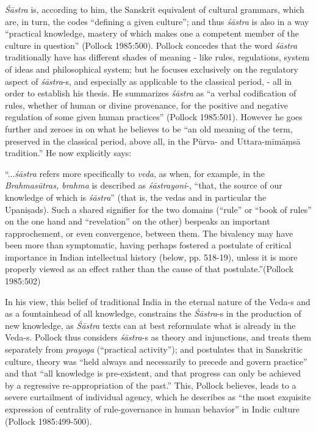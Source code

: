 {\sl Śāstra} is, according to him, the Sanskrit equivalent of cultural grammars, which are, in turn, the codes ``defining a given culture''; and thus {\sl śāstra} is also in a way ``practical knowledge, mastery of which makes one a competent member of the culture in question'' (Pollock 1985:500). Pollock concedes that the word {\sl śāstra} traditionally have has different shades of meaning - like rules, regulations, system of ideas and philosophical system; but he focuses exclusively on the regulatory aspect of {\sl śāstra}-s, and especially as applicable to the classical period, - all in order to establish his thesis. He summarizes {\sl śāstra} as ``a verbal codification of rules, whether of human or divine provenance, for the positive and negative regulation of some given human practices'' (Pollock 1985:501). However he goes further and zeroes in on what he believes to be ``an old meaning of the term, preserved in the classical period, above all, in the Pūrva- and Uttara-mīmāṃsā tradition.'' He now explicitly says: 
\begin{myquote}
``...{\sl śāstra} refers more specifically to {\sl veda}, as when, for example, in the {\sl Brahmasūtras, brahma} is described as {\sl śāstrayoni}-, ``that, the source of our knowledge of which is {\sl śāstra}'' (that is, the vedas and in particular the Upaniṣads). Such a shared signifier for the two domains (``rule'' or ``book of rules'' on the one hand and ``revelation'' on the other) bespeaks an important rapprochement, or even convergence, between them. The bivalency may have been more than symptomatic, having perhaps fostered a postulate of critical importance in Indian intellectual history (below, pp. 518-19), unless it is more properly viewed as an effect rather than the cause of that postulate.”\hfill 	(Pollock 1985:502)
\end{myquote}

In his view, this belief of traditional India in the eternal nature of the Veda-s and as a fountainhead of all knowledge, constrains the {\sl Śāstra}-s in the production of new knowledge, as {\sl Śāstra} texts can at best reformulate what is already in the Veda-s. Pollock thus considers {\sl śāstra}-s as theory and injunctions, and treats them separately from {\sl prayoga} (``practical activity''); and postulates that in Sanskritic culture, theory was ``held always and necessarily to precede and govern practice'' and that ``all knowledge is pre-existent, and that progress can only be achieved by a regressive re-appropriation of the past.'' This, Pollock believes, leads to a severe curtailment of individual agency, which he describes as ``the most exquisite expression of centrality of rule-governance in human behavior'' in Indic culture (Pollock 1985:499-500). 

